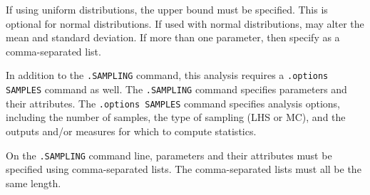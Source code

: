 \begin{Command}
\begin{Arguments}
If using uniform distributions, the upper bound must be specified.  This is optional for normal distributions.
  If used with normal distributions, may alter the mean and standard deviation.
  If more than one parameter, then specify as a comma-separated list.

\end{Arguments}

\comments

In addition to the \verb|.SAMPLING| command, this analysis requires a 
  \verb|.options SAMPLES| command as well.  The \verb|.SAMPLING| command specifies 
  parameters and their attributes.  The \verb|.options SAMPLES| command specifies 
  analysis options, including the number of samples, the type of sampling (LHS or MC), 
  and the outputs and/or measures for which to compute statistics.

On the \verb|.SAMPLING| command line, parameters and their attributes must be specified 
  using comma-separated lists.  The comma-separated lists must all be the same length.

\end{Command}

